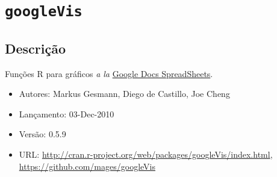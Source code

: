 \section{\texttt{googleVis}}


\subsection{Descrição}

\begin{frame}

  Funções R para gráficos \textit{a la}
  \href{https://developers.google.com/chart/interactive/docs/gallery}{Google
    Docs SpreadSheets}.
  \vspace{2em}

  \begin{itemize}
  \item Autores: Markus Gesmann, Diego de Castillo, Joe Cheng
  \item Lançamento: 03-Dec-2010
  \item Versão: 0.5.9
  \item URL:
    \url{http://cran.r-project.org/web/packages/googleVis/index.html},
    \url{https://github.com/mages/googleVis}
  \end{itemize}
  
\end{frame}


